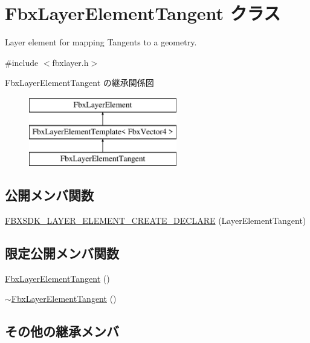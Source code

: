\hypertarget{class_fbx_layer_element_tangent}{}\section{Fbx\+Layer\+Element\+Tangent クラス}
\label{class_fbx_layer_element_tangent}


Layer element for mapping Tangents to a geometry.  




{\ttfamily \#include $<$fbxlayer.\+h$>$}

Fbx\+Layer\+Element\+Tangent の継承関係図\begin{figure}[H]
\begin{center}
\leavevmode
\includegraphics[height=3.000000cm]{class_fbx_layer_element_tangent}
\end{center}
\end{figure}
\subsection*{公開メンバ関数}
\begin{DoxyCompactItemize}
\item 
\hyperlink{class_fbx_layer_element_tangent_af6de658c6e0e7ac0702ca2f1b0d6fbdf}{F\+B\+X\+S\+D\+K\+\_\+\+L\+A\+Y\+E\+R\+\_\+\+E\+L\+E\+M\+E\+N\+T\+\_\+\+C\+R\+E\+A\+T\+E\+\_\+\+D\+E\+C\+L\+A\+RE} (Layer\+Element\+Tangent)
\end{DoxyCompactItemize}
\subsection*{限定公開メンバ関数}
\begin{DoxyCompactItemize}
\item 
\hyperlink{class_fbx_layer_element_tangent_a60810894777829d4fc767f0f63706523}{Fbx\+Layer\+Element\+Tangent} ()
\item 
\hyperlink{class_fbx_layer_element_tangent_a009269c1cc4c57a727e469e66fc5a09b}{$\sim$\+Fbx\+Layer\+Element\+Tangent} ()
\end{DoxyCompactItemize}
\subsection*{その他の継承メンバ}


